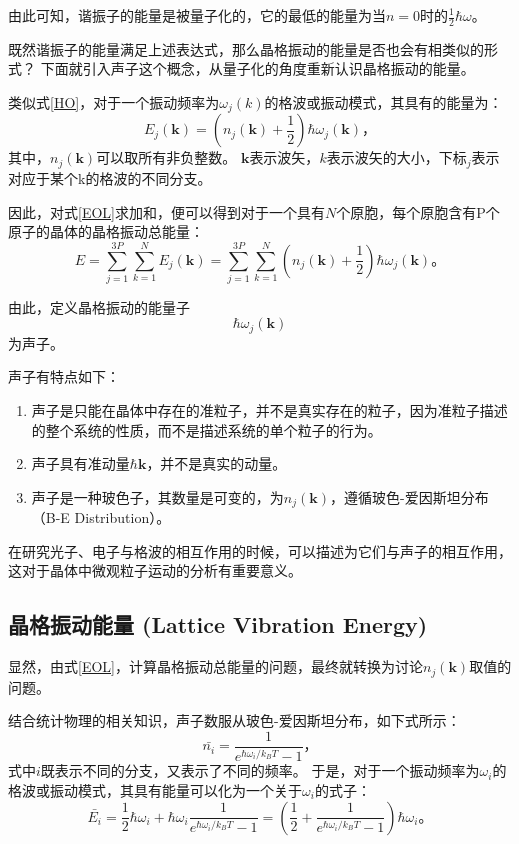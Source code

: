 \documentclass[declarePage]{ecnuthesis}
\begin{document}
由此可知，谐振子的能量是被量子化的，它的最低的能量为当$n=0$时的$\frac{1}{2} \hbar \omega$。

既然谐振子的能量满足上述表达式，那么晶格振动的能量是否也会有相类似的形式？%
下面就引入声子这个概念，从量子化的角度重新认识晶格振动的能量。

类似式\ref{HO}，对于一个振动频率为$\omega_j(k)$的格波或振动模式，其具有的能量为：
\begin{equation}
    E_j(\mathbf{k}) = (n_j(\mathbf{k}) + \frac{1}{2})\hbar \omega_j(\mathbf{k}) \text{，} \label{EOL}
\end{equation}
其中，$n_j(\mathbf{k})$可以取所有非负整数。%
$\mathbf{k}$表示波矢，$k$表示波矢的大小，下标$_j$表示对应于某个k的格波的不同分支。

因此，对式\ref{EOL}求加和，便可以得到对于一个具有$N$个原胞，每个原胞含有P个原子的晶体的晶格振动总能量：
\begin{equation}
    E = \sum_{j=1}^{3P}\sum_{k=1}^{N}E_j(\mathbf{k}) = \sum_{j=1}^{3P}\sum_{k=1}^{N}(n_j(\mathbf{k}) + \frac{1}{2})\hbar \omega_j(\mathbf{k}) \text{。} \label{EOC}
\end{equation}

由此，定义晶格振动的能量子
\begin{equation}
    \hbar \omega_j(\mathbf{k})
\end{equation}
为声子。

声子有特点如下：\cite{phonon}
\begin{enumerate}
    \item 声子是只能在晶体中存在的准粒子，并不是真实存在的粒子，因为准粒子描述的整个系统的性质，而不是描述系统的单个粒子的行为。
    \item 声子具有准动量$\hbar \mathbf{k}$，并不是真实的动量。
    \item 声子是一种玻色子，其数量是可变的，为$n_j(\mathbf{k})$，遵循玻色-爱因斯坦分布（B-E Distribution）。
\end{enumerate}

在研究光子、电子与格波的相互作用的时候，可以描述为它们与声子的相互作用，这对于晶体中微观粒子运动的分析有重要意义。

\subsection{晶格振动能量 (Lattice Vibration Energy)}

显然，由式\ref{EOL}，计算晶格振动总能量的问题，最终就转换为讨论$n_j(\mathbf{k})$取值的问题。

结合统计物理的相关知识，声子数服从玻色-爱因斯坦分布，如下式所示：
\begin{equation}
    \bar{n_i} = \frac{1}{e^{\hbar \omega_i / k_B T}-1} \text{，}
\end{equation}
式中$i$既表示不同的分支，又表示了不同的频率。%
于是，对于一个振动频率为$\omega_i$的格波或振动模式，其具有能量可以化为一个关于$\omega_i$的式子：
\begin{equation}
    \bar{E_i} = \frac{1}{2}\hbar \omega_i + \hbar \omega_i \frac{1}{e^{\hbar \omega_i / k_B T}-1} = \left(\frac{1}{2} + \frac{1}{e^{\hbar \omega_i / k_B T}-1}\right)\hbar \omega_i \text{。} \label{EOL2}
\end{equation}
\end{document}
